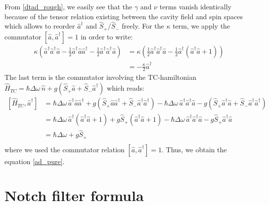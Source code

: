 \documentclass[11pt]{report}
\begin{document}
From \ref{dtad_rough}, we easily see that the $\gamma$ and $\nu$ terms vanish identically because of the tensor relation existing between the cavity field and spin spaces which allows to reorder $\hat{a}^\dag$ and $\hat{S}_+ / \hat{S}_-$ freely. For the $\kappa$ term, we apply the commutator $\left[ \hat{a}, \hat{a}^\dagger \right] = 1$ in order to write:
\begin{equation}
\begin{split}
\kappa \left( \hat{a}^\dagger \hat{a}^\dagger \hat{a} - \frac{1}{2} \hat{a}^\dagger \hat{a} \hat{a}^\dagger - \frac{1}{2} \hat{a}^\dagger \hat{a}^\dagger \hat{a} \right) &= \kappa \left( \frac{1}{2}\hat{a}^\dagger \hat{a}^\dagger \hat{a} - \frac{1}{2} \hat{a}^\dagger (\hat{a}^\dagger \hat{a} + 1) \right)\\
&= -\frac{\kappa}{2} \hat{a}^\dagger
\end{split}
\end{equation}
The last term is the commutator involving the TC-hamiltonian $\hat{H}_{TC} = \hbar\Delta\omega\,\hat{n} + g \left(\hat{S}_+ \hat{a} + \hat{S}_-\hat{a}^{\dag} \right)$ which reads:
\begin{equation}
\begin{split}
\left[ \hat{H}_{TC}, \hat{a}^\dag \right] &= \hbar\Delta\omega\,\hat{a}^\dag\hat{a}\hat{a}^\dag + g\left(\hat{S}_+ \hat{a}\hat{a}^\dag + \hat{S}_-\hat{a}^{\dag}\hat{a}^\dag \right) - \hbar\Delta\omega\,\hat{a}^\dag\hat{a}^\dag\hat{a} - g\left(\hat{S}_+ \hat{a}^\dag\hat{a} + \hat{S}_-\hat{a}^{\dag}\hat{a}^\dag \right) \\
&= \hbar\Delta\omega\,\hat{a}^\dag(\hat{a}^\dag\hat{a} + 1) + g\hat{S}_+ (\hat{a}^\dag\hat{a} + 1) - \hbar\Delta\omega\,\hat{a}^\dag\hat{a}^\dag\hat{a} - g\hat{S}_+ \hat{a}^\dag\hat{a} \\
&= \hbar\Delta\omega + g\hat{S}_+ \\
\end{split}
\end{equation}
where we used the commutator relation $\left[ \hat{a}, \hat{a}^\dagger \right] = 1$. Thus, we obtain the equation \ref{ad_pure}.

\section{Notch filter formula}
\label{notch_filter_formula}
\end{document}
